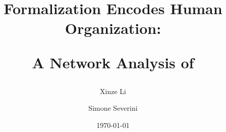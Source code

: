 \documentclass[11pt]{article}
\title{Formalization Encodes Human Organization: 

A Network Analysis of \module{Mathlib}}
\author{Xinze Li \and Simone Severini}
\date{\today}
\begin{document}
\maketitle

\begin{abstract}




\end{abstract}
\end{document}
